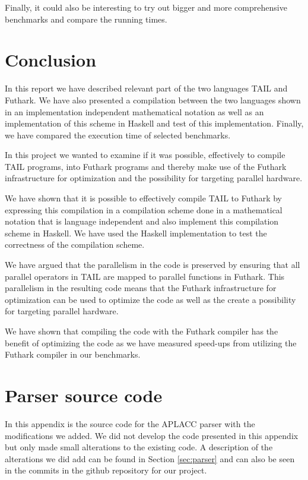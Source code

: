 \documentclass[11pt]{article}
\begin{document}
Finally, it could also be interesting to try out bigger and more comprehensive benchmarks and compare the running times.

\section{Conclusion}
\label{sec:conclusion}

In this report we have described relevant part of the two languages TAIL and Futhark. 
We have also presented a compilation between the two languages shown in an implementation independent mathematical notation as well as an implementation of this scheme in Haskell and test of this implementation. 
Finally, we have compared the execution time of selected benchmarks. 

In this project we wanted to examine if it was possible, effectively to compile TAIL programs, into Futhark programs and thereby make use of the Futhark infrastructure for optimization and the possibility for targeting parallel hardware.

We have shown that it is possible to effectively compile TAIL to Futhark by expressing this compilation in a compilation scheme done in a mathematical notation that is language independent and also implement this compilation scheme in Haskell. We have used the Haskell implementation to test the correctness of the compilation scheme. 

We have argued that the parallelism in the code is preserved by ensuring that all parallel operators in TAIL are mapped to parallel functions in Futhark.
This parallelism in the resulting code means that the Futhark infrastructure for optimization can be used to optimize the code as well as the create a possibility for targeting parallel hardware. 

We have shown that compiling the code with the Futhark compiler has the benefit of optimizing the code as we have measured speed-ups from utilizing the Futhark compiler in our benchmarks.

{} 


\newpage

\appendix
\section{Parser source code}
\label{app:parser}

In this appendix is the source code for the APLACC parser \cite{APLACC} with the modifications we added.
We did not develop the code presented in this appendix but only made small alterations to the existing code.
A description of the alterations we did add can be found in Section \ref{sec:parser} and can also be seen in the commits in the github repository for our project. 
\end{document}
